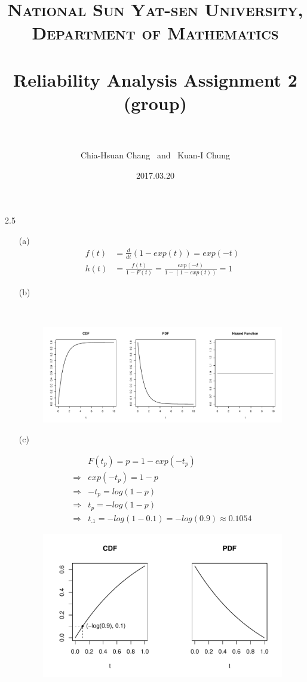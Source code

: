 \documentclass[paper=a4, fontsize=11pt]{scrartcl} %
\title{	
\normalfont \normalsize 
\textsc{National Sun Yat-sen University, Department of Mathematics} \\ [25pt] %
\horrule{0.5pt} \\[0.4cm] %
\huge Reliability Analysis Assignment 2 \\(group)\\ %
\horrule{2pt} \\[0.5cm] %
}
\author{Chia-Hsuan Chang \ and \ Kuan-I Chung} %
\date{\normalsize 2017.03.20} %
\numberwithin{equation}{section} %
\numberwithin{figure}{section} %
\numberwithin{table}{section} %
\begin{document}
\maketitle %

2.5
\begin{itemize}
	\item[(a)]{
		\begin{align*}
			f(t)	&=	\frac{d}{dt}(1-exp(t)) = exp(-t)\\
			h(t)	&=	\frac{f(t)}{1-F(t)} = \frac{exp(-t)}{1-(1-exp(t))} = 1
		\end{align*}
	}
	
	\item[(b)]{\
		\begin{figure}[h]
			\includegraphics[width = 5.5 in]{2_5_b.pdf}
		\end{figure}

	}
	
	\item[(c)]{
		\begin{align*}
						&	F(t_p) = p = 1-exp(-t_p)\\
			\Rightarrow	&	exp(-t_p) = 1-p\\
			\Rightarrow	&	-t_p = log(1-p)	\\
			\Rightarrow	&	t_p = -log(1-p) \\
			\Rightarrow	&	t_{.1} = -log(1-0.1) = -log(0.9) \approx 0.1054
		\end{align*}
		\begin{figure}[h]
			\centering
			\includegraphics[width = 3.8 in]{2_5_c.pdf}
		\end{figure}
	}
	

\end{itemize}
\end{document}
